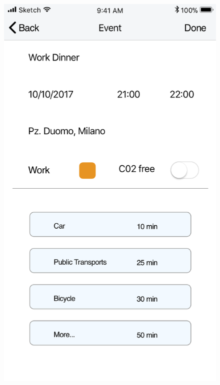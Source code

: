 \begin{enumerate}
\begin{figure}[H]
				\hspace{0.5cm}
				\includegraphics[scale=0.25]{Images/Sketch/Event_Creation_2}
				\hspace{0.5cm}

\end{figure}
\end{enumerate}
